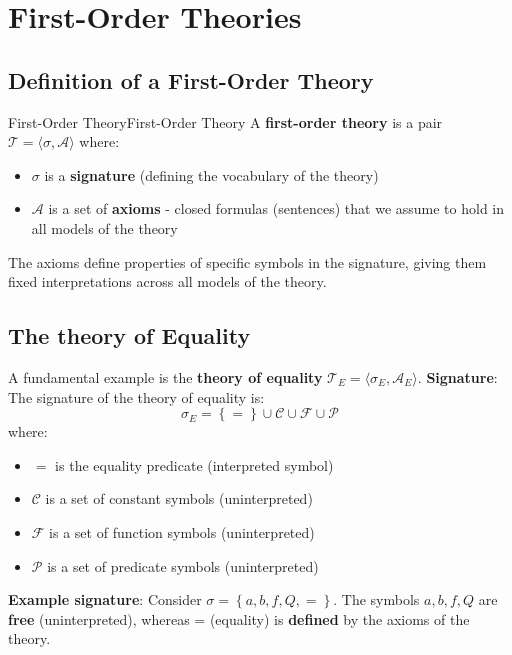 \documentclass[a4paper]{article}
\theoremstyle{definition}
\begin{document}
\section{First-Order Theories}
\subsection{Definition of a First-Order Theory}
\begin{definition}{First-Order Theory}{First-Order Theory}
A \textbf{first-order theory} is a pair \( \mathcal{T} = \langle \sigma, \mathcal{A} \rangle \) where:
\begin{itemize}
	\item \( \sigma \) is a \textbf{signature} (defining the vocabulary of the theory)
	\item \( \mathcal{A} \) is a set of \textbf{axioms} - closed formulas (sentences) that we assume to hold in all models of the theory
\end{itemize}
\end{definition}
The axioms define properties of specific symbols in the signature, giving them fixed interpretations across all models of the theory.
\subsection{The theory of Equality}
A fundamental example is the \textbf{theory of equality} \( \mathcal{T}_{E} = \langle \sigma_{E}, \mathcal{A}_{E} \rangle \).
\vspace{1em}
\noindent
\newline
\textbf{Signature}: The signature of the theory of equality is:
\[
  \sigma_{E} = \left\{ = \right\} \cup \mathcal{C} \cup \mathcal{F} \cup \mathcal{P}
\]
where:
\begin{itemize}
	\item \( = \) is the equality predicate (interpreted symbol)
	\item \( \mathcal{C} \) is a set of constant symbols (uninterpreted)
	\item \( \mathcal{F} \) is a set of function symbols (uninterpreted)
	\item \( \mathcal{P} \) is a set of predicate symbols (uninterpreted)
\end{itemize}
\textbf{Example signature}: Consider \( \sigma = \left\{ a,b,f,Q,= \right\} \). The symbols \( a,b,f,Q \) are \textbf{free} (uninterpreted), 
whereas = (equality) is \textbf{defined} by the axioms of the theory.
\end{document}
